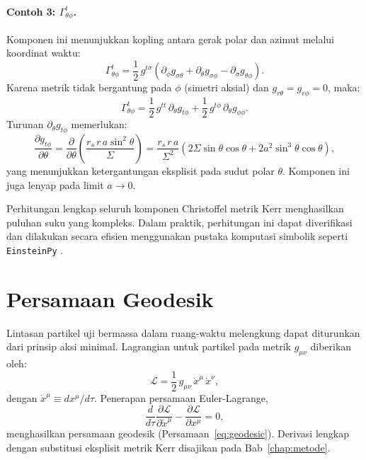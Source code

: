 \paragraph{Contoh 3: $\Gamma^t_{\theta\phi}$.}
Komponen ini menunjukkan kopling antara gerak polar dan azimut melalui koordinat waktu:
\begin{equation}
    \Gamma^t_{\theta\phi} = \frac{1}{2}\,g^{t\sigma}
    \left(\partial_\phi g_{\sigma\theta} + \partial_\theta g_{\sigma\phi} - \partial_\sigma g_{\theta\phi}\right).
\end{equation}
Karena metrik tidak bergantung pada $\phi$ (simetri aksial) dan $g_{r\theta} = g_{r\phi} = 0$, maka:
\begin{equation}
    \Gamma^t_{\theta\phi} = \frac{1}{2}\,g^{tt}\,\partial_\theta g_{t\phi}
                          + \frac{1}{2}\,g^{t\phi}\,\partial_\theta g_{\phi\phi}.
    \label{eq:christoffel-tthetaphi}
\end{equation}
Turunan $\partial_\theta g_{t\phi}$ memerlukan:
\begin{equation}
    \frac{\partial g_{t\phi}}{\partial\theta}
    = \frac{\partial}{\partial\theta}
    \!\left(\frac{r_s\, r\, a\sin^2\!\theta}{\Sigma}\right)
    = \frac{r_s\, r\, a}{\Sigma^2}
    \left(2\Sigma\sin\theta\cos\theta + 2a^2\sin^3\!\theta\cos\theta\right),
\end{equation}
yang menunjukkan ketergantungan eksplisit pada sudut polar $\theta$. Komponen ini juga lenyap pada limit $a \to 0$.

Perhitungan lengkap seluruh komponen Christoffel metrik Kerr menghasilkan puluhan suku yang kompleks. Dalam praktik, perhitungan ini dapat diverifikasi dan dilakukan secara efisien menggunakan pustaka komputasi simbolik seperti \texttt{EinsteinPy} \parencite{Bapat2020EinsteinPy}.


\section{Persamaan Geodesik}
\label{sec:persamaan-geodesik}

Lintasan partikel uji bermassa dalam ruang-waktu melengkung dapat diturunkan dari prinsip aksi minimal. Lagrangian untuk partikel pada metrik $g_{\mu\nu}$ diberikan oleh:
\begin{equation}
    \mathcal{L} = \frac{1}{2}\, g_{\mu\nu}\, \dot{x}^\mu\, \dot{x}^\nu,
    \label{eq:lagrangian}
\end{equation}
dengan $\dot{x}^\mu \equiv dx^\mu/d\tau$. Penerapan persamaan Euler-Lagrange,
\begin{equation}
    \frac{d}{d\tau}\frac{\partial\mathcal{L}}{\partial\dot{x}^\mu}
    - \frac{\partial\mathcal{L}}{\partial x^\mu} = 0,
\end{equation}
menghasilkan persamaan geodesik (Persamaan~\ref{eq:geodesic}). Derivasi lengkap dengan substitusi eksplisit metrik Kerr disajikan pada Bab~\ref{chap:metode}.

